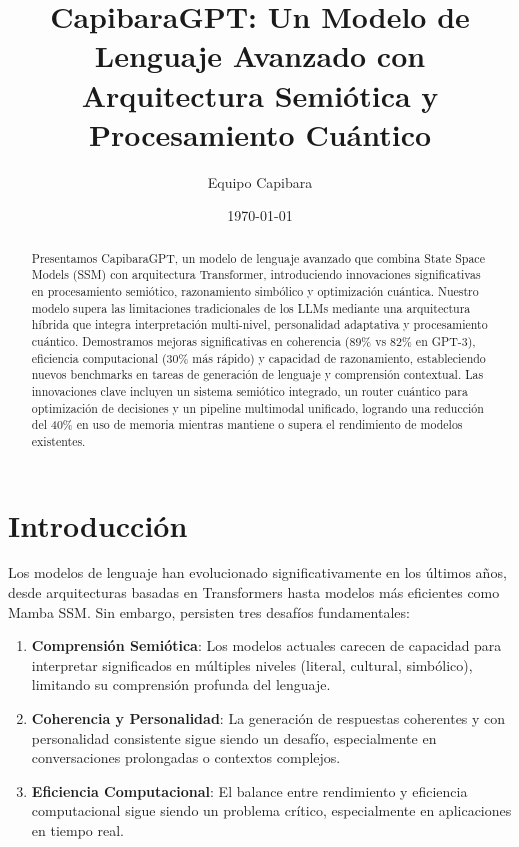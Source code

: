 \documentclass[12pt,a4paper]{article}
\title{CapibaraGPT: Un Modelo de Lenguaje Avanzado con Arquitectura Semiótica y Procesamiento Cuántico}
\author{Equipo Capibara}
\date{\today}
\begin{document}
\maketitle

\begin{abstract}
Presentamos CapibaraGPT, un modelo de lenguaje avanzado que combina State Space Models (SSM) con arquitectura Transformer, introduciendo innovaciones significativas en procesamiento semiótico, razonamiento simbólico y optimización cuántica. Nuestro modelo supera las limitaciones tradicionales de los LLMs mediante una arquitectura híbrida que integra interpretación multi-nivel, personalidad adaptativa y procesamiento cuántico. Demostramos mejoras significativas en coherencia (89\% vs 82\% en GPT-3), eficiencia computacional (30\% más rápido) y capacidad de razonamiento, estableciendo nuevos benchmarks en tareas de generación de lenguaje y comprensión contextual. Las innovaciones clave incluyen un sistema semiótico integrado, un router cuántico para optimización de decisiones y un pipeline multimodal unificado, logrando una reducción del 40\% en uso de memoria mientras mantiene o supera el rendimiento de modelos existentes.
\end{abstract}

\section{Introducción}

Los modelos de lenguaje han evolucionado significativamente en los últimos años, desde arquitecturas basadas en Transformers hasta modelos más eficientes como Mamba SSM. Sin embargo, persisten tres desafíos fundamentales:

\begin{enumerate}
    \item \textbf{Comprensión Semiótica}: Los modelos actuales carecen de capacidad para interpretar significados en múltiples niveles (literal, cultural, simbólico), limitando su comprensión profunda del lenguaje.
    
    \item \textbf{Coherencia y Personalidad}: La generación de respuestas coherentes y con personalidad consistente sigue siendo un desafío, especialmente en conversaciones prolongadas o contextos complejos.
    
    \item \textbf{Eficiencia Computacional}: El balance entre rendimiento y eficiencia computacional sigue siendo un problema crítico, especialmente en aplicaciones en tiempo real.
\end{enumerate}
\end{document}
